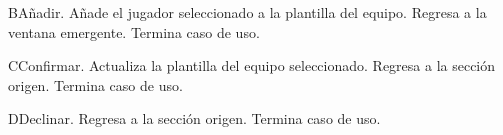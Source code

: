 	\begin{UCtrayectoriaA}{B}{Añadir.}
		\UCpaso Añade el jugador seleccionado a la plantilla del equipo.
		\UCpaso Regresa a la ventana emergente.
		\UCpaso Termina caso de uso.
	\end{UCtrayectoriaA}
	
	\begin{UCtrayectoriaA}{C}{Confirmar.}
		\UCpaso Actualiza la plantilla del equipo seleccionado.
		\UCpaso Regresa a la sección origen.
		\UCpaso Termina caso de uso.
	\end{UCtrayectoriaA}
	
	\begin{UCtrayectoriaA}{D}{Declinar.}
		\UCpaso Regresa a la sección origen.
		\UCpaso Termina caso de uso.
	\end{UCtrayectoriaA}

